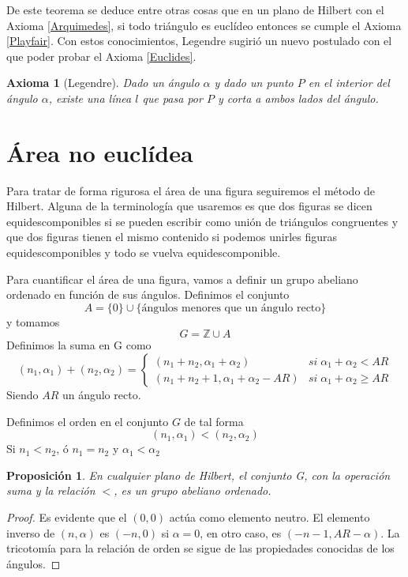 \documentclass[a4paper]{amsart}
\theoremstyle{plain}
\newtheorem{proposition}{Proposición}
\newtheorem{axiom}{Axioma}
\begin{document}
De este teorema se deduce entre otras cosas que en un plano de Hilbert con el Axioma \ref{Arquimedes}, si todo triángulo es euclídeo entonces se cumple el Axioma \ref{Playfair}. Con estos conocimientos, Legendre sugirió un nuevo postulado  con el que poder probar el Axioma \ref{Euclides}.

\begin{axiom}[Legendre]\label{Legendre}
Dado un ángulo $\alpha$ y dado un punto $P$ en el interior del ángulo $\alpha$, existe una línea $l$ que pasa por $P$ y corta a ambos lados del ángulo.
\end{axiom}

\section{Área no euclídea}

Para tratar de forma rigurosa el área de una figura seguiremos el método de Hilbert. Alguna de la terminología que usaremos es que dos figuras se dicen equidescomponibles si se pueden escribir como unión de triángulos congruentes y que dos figuras tienen el mismo contenido si podemos unirles figuras equidescomponibles y todo se vuelva equidescomponible.

Para cuantificar el área de una figura, vamos a definir un grupo abeliano ordenado en función de sus ángulos. Definimos el conjunto
\[
A=\{0 \} \cup \{\mbox{ángulos menores que un ángulo recto}\}
\]
y tomamos
\[
G=\mathbb{Z}\cup A
\]
Definimos la suma en G como
\[
(n_1,\alpha _1)+(n_2,\alpha _2)=
\begin{cases}
 (n_1 + n_2, \alpha _1 + \alpha _2) & si\; \alpha _1 + \alpha _2 < AR \\
 (n_1 + n_2 +1, \alpha _1 + \alpha _2- AR) & si\; \alpha _1 + \alpha _2 \geq AR
\end{cases}
\]
Siendo $AR$ un ángulo recto.

Definimos el orden en el conjunto $G$ de tal forma
\[
(n_1,\alpha_1)<(n_2,\alpha_2)
\]
Si $n_1<n_2$, ó $n_1=n_2$ y $\alpha_1<\alpha_2$

\begin{proposition}
En cualquier plano de Hilbert, el conjunto G, con la operación suma y la relación $<$, es un grupo abeliano ordenado.
\end{proposition}

\begin{proof}
Es evidente que el $(0,0)$ actúa como elemento neutro. El elemento inverso de $(n,\alpha)$ es $(-n,0)$ si $\alpha=0$, en otro caso, es $(-n-1,AR-\alpha)$. La tricotomía para la relación de orden se sigue de las propiedades conocidas de los ángulos.
\end{proof}
\end{document}
